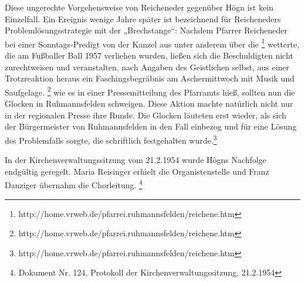 Diese ungerechte Vorgehensweise von Reicheneder gegenüber Högn ist kein
Einzelfall. Ein Ereignis wenige Jahre später ist bezeichnend für
Reicheneders Problemlösungsstrategie mit der „Brechstange“: Nachdem
Pfarrer Reicheneder bei einer Sonntags-Predigt von der Kanzel aus unter
anderem über die  \footnote{
http://home.vrweb.de/pfarrei.ruhmannsfelden/reichene.htm} wetterte, die
am Fußballer Ball 1957 verliehen wurden, ließen sich die Beschuldigten
nicht zurechtweisen und veranstalten, nach Angaben des Geistlichen
selbst, aus einer Trotzreaktion heraus ein Faschingsbegräbnis am
Aschermittwoch mit Musik und Saufgelage. \footnote{
http://home.vrweb.de/pfarrei.ruhmannsfelden/reichene.htm} wie es in
einer Pressemitteilung des Pfarramts hieß, sollten nun die Glocken in
Ruhmannsfelden schweigen. Diese Aktion machte natürlich nicht nur in
der regionalen Presse ihre Runde. Die Glocken läuteten erst wieder, als
sich der Bürgermeister von Ruhmannsfelden in den Fall einbezog und für
eine Lösung des Problemfalls sorgte, die schriftlich festgehalten
wurde.\footnote{
http://home.vrweb.de/pfarrei.ruhmannsfelden/reichene.htm}

In der Kirchenverwaltungssitzung vom 21.2.1954 wurde Högns Nachfolge
endgültig geregelt. Maria Reisinger erhielt die Organistenstelle und
Franz Danziger übernahm die Chorleitung. \footnote{Dokument Nr. 124,
Protokoll der Kirchenverwaltungssitzung, 21.2.1954}
